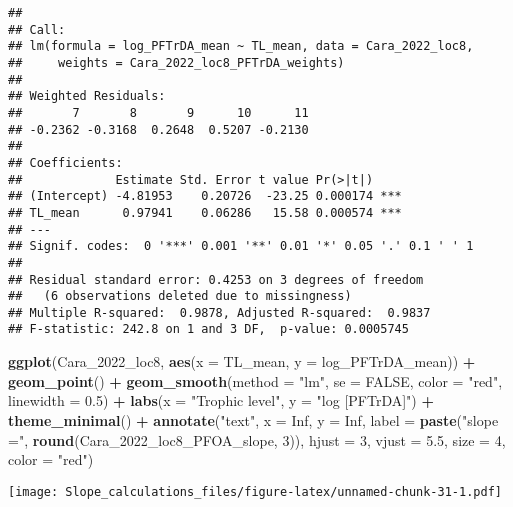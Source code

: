 \documentclass[
]{article}
\newenvironment{Shaded}{\begin{snugshade}}{\end{snugshade}}
\newcommand{\AttributeTok}[1]{\textcolor[rgb]{0.13,0.29,0.53}{#1}}
\newcommand{\ConstantTok}[1]{\textcolor[rgb]{0.56,0.35,0.01}{#1}}
\newcommand{\DecValTok}[1]{\textcolor[rgb]{0.00,0.00,0.81}{#1}}
\newcommand{\FloatTok}[1]{\textcolor[rgb]{0.00,0.00,0.81}{#1}}
\newcommand{\FunctionTok}[1]{\textcolor[rgb]{0.13,0.29,0.53}{\textbf{#1}}}
\newcommand{\NormalTok}[1]{#1}
\newcommand{\SpecialCharTok}[1]{\textcolor[rgb]{0.81,0.36,0.00}{\textbf{#1}}}
\newcommand{\StringTok}[1]{\textcolor[rgb]{0.31,0.60,0.02}{#1}}
\begin{document}
\begin{verbatim}
## 
## Call:
## lm(formula = log_PFTrDA_mean ~ TL_mean, data = Cara_2022_loc8, 
##     weights = Cara_2022_loc8_PFTrDA_weights)
## 
## Weighted Residuals:
##       7       8       9      10      11 
## -0.2362 -0.3168  0.2648  0.5207 -0.2130 
## 
## Coefficients:
##             Estimate Std. Error t value Pr(>|t|)    
## (Intercept) -4.81953    0.20726  -23.25 0.000174 ***
## TL_mean      0.97941    0.06286   15.58 0.000574 ***
## ---
## Signif. codes:  0 '***' 0.001 '**' 0.01 '*' 0.05 '.' 0.1 ' ' 1
## 
## Residual standard error: 0.4253 on 3 degrees of freedom
##   (6 observations deleted due to missingness)
## Multiple R-squared:  0.9878, Adjusted R-squared:  0.9837 
## F-statistic: 242.8 on 1 and 3 DF,  p-value: 0.0005745
\end{verbatim}

\begin{Shaded}
\begin{Highlighting}[]
\FunctionTok{ggplot}\NormalTok{(Cara\_2022\_loc8, }\FunctionTok{aes}\NormalTok{(}\AttributeTok{x =}\NormalTok{ TL\_mean, }\AttributeTok{y =}\NormalTok{ log\_PFTrDA\_mean)) }\SpecialCharTok{+}
  \FunctionTok{geom\_point}\NormalTok{() }\SpecialCharTok{+}
  \FunctionTok{geom\_smooth}\NormalTok{(}\AttributeTok{method =} \StringTok{"lm"}\NormalTok{, }\AttributeTok{se =} \ConstantTok{FALSE}\NormalTok{, }\AttributeTok{color =} \StringTok{"red"}\NormalTok{, }\AttributeTok{linewidth =} \FloatTok{0.5}\NormalTok{) }\SpecialCharTok{+}
  \FunctionTok{labs}\NormalTok{(}\AttributeTok{x =} \StringTok{"Trophic level"}\NormalTok{,}
       \AttributeTok{y =} \StringTok{"log [PFTrDA]"}\NormalTok{) }\SpecialCharTok{+}
  \FunctionTok{theme\_minimal}\NormalTok{() }\SpecialCharTok{+}
  \FunctionTok{annotate}\NormalTok{(}\StringTok{"text"}\NormalTok{, }\AttributeTok{x =} \ConstantTok{Inf}\NormalTok{, }\AttributeTok{y =} \ConstantTok{Inf}\NormalTok{, }\AttributeTok{label =} \FunctionTok{paste}\NormalTok{(}\StringTok{"slope ="}\NormalTok{, }\FunctionTok{round}\NormalTok{(Cara\_2022\_loc8\_PFOA\_slope, }\DecValTok{3}\NormalTok{)), }
           \AttributeTok{hjust =} \DecValTok{3}\NormalTok{, }\AttributeTok{vjust =} \FloatTok{5.5}\NormalTok{, }\AttributeTok{size =} \DecValTok{4}\NormalTok{, }\AttributeTok{color =} \StringTok{"red"}\NormalTok{)}
\end{Highlighting}
\end{Shaded}

\texttt{[image: Slope\_calculations\_files/figure-latex/unnamed-chunk-31-1.pdf]}
\end{document}
